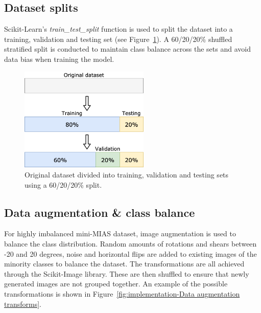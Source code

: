 
\subsection{Dataset splits}

Scikit-Learn's \textit{train\_test\_split} function is used to split the dataset into a training, validation and testing set (see Figure~\ref{fig:dataset_splits}). A 60/20/20\% shuffled stratified split is conducted to maintain class balance across the sets and avoid data bias when training the model. 

\begin{figure}[ht]
\centerline{\includegraphics[width=0.55\textwidth]{figures/implementation/dataset_splits.png}}
\caption{\label{fig:dataset_splits}Original dataset divided into training, validation and testing sets using a 60/20/20\% split.}
\end{figure}


\subsection{Data augmentation \& class balance}

For highly imbalanced mini-MIAS dataset, image augmentation is used to balance the class distribution. Random amounts of rotations and shears between -20 and 20 degrees, noise and horizontal flips are added to existing images of the minority classes to balance the dataset. The transformations are all achieved through the Scikit-Image library. These are then shuffled to ensure that newly generated images are not grouped together. An example of the possible transformations is shown in Figure~\ref{fig:implementation-Data augmentation transforms}.

